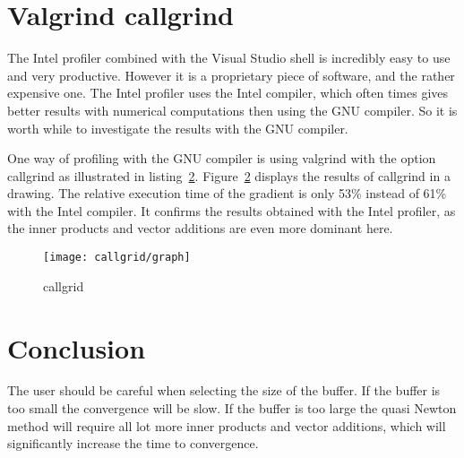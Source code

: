 \section{Valgrind callgrind}
The Intel profiler combined with the Visual Studio shell is incredibly easy to use and very productive. However it is a proprietary piece of software, and the rather expensive one. The Intel profiler uses the Intel compiler, which often times gives better results with numerical computations then using the GNU compiler. So it is worth while to investigate the results with the GNU compiler.

One way of profiling with the GNU compiler is using valgrind with the option callgrind as illustrated in listing~\ref{}. Figure~\ref{} displays the results of callgrind in a drawing. The relative execution time of the gradient is only 53\% instead of 61\% with the Intel compiler. It confirms the results obtained with the Intel profiler, as the inner products and vector additions are even more dominant here.
\begin{figure}[H]
	\centering
	\texttt{[image: callgrid/graph]}
	\caption{callgrid}
	\label{fig:callgrid}
\end{figure}

\section{Conclusion}
The user should be careful when selecting the size of the buffer. If the buffer is too small the convergence will be slow. If the buffer is too large the quasi Newton method will require all lot more inner products and vector additions, which will significantly increase the time to convergence.
